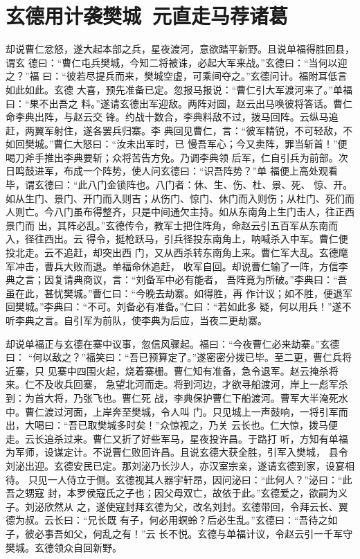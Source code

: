 \chapter{玄德用计袭樊城~元直走马荐诸葛}

却说曹仁忿怒，遂大起本部之兵，星夜渡河，意欲踏平新野。且说单福得胜回县，谓玄
德曰：“曹仁屯兵樊城，今知二将被诛，必起大军来战。”玄德曰：“当何以迎之？”福
曰：“彼若尽提兵而来，樊城空虚，可乘间夺之。”玄德问计。福附耳低言如此如此。玄德
大喜，预先准备已定。忽报马报说：“曹仁引大军渡河来了。”单福曰：“果不出吾之
料。”遂请玄德出军迎敌。两阵对圆，赵云出马唤彼将答话。曹仁命李典出阵，与赵云交
锋。约战十数合，李典料敌不过，拨马回阵。云纵马追赶，两翼军射住，遂各罢兵归寨。李
典回见曹仁，言：“彼军精锐，不可轻敌，不如回樊城。”曹仁大怒曰：“汝未出军时，已
慢吾军心；今又卖阵，罪当斩首！”便喝刀斧手推出李典要斩；众将苦告方免。乃调李典领
后军，仁自引兵为前部。次日鸣鼓进军，布成一个阵势，使人问玄德曰：“识吾阵势？”单
福便上高处观看毕，谓玄德曰：“此八门金锁阵也。八门者：休、生、伤、杜、景、死、
惊、开。如从生门、景门、开门而入则吉；从伤门、惊门、休门而入则伤；从杜门、死们而
人则亡。今八门虽布得整齐，只是中间通欠主持。如从东南角上生门击人，往正西景门而
出，其阵必乱。”玄德传令，教军士把住阵角，命赵云引五百军从东南而入，径往西出。云
得令，挺枪跃马，引兵径投东南角上，呐喊杀入中军。曹仁便投北走。云不追赶，却突出西
门，又从西杀转东南角上来。曹仁军大乱。玄德麾军冲击，曹兵大败而退。单福命休追赶，
收军自回。却说曹仁输了一阵，方信李典之言；因复请典商议，言：“刘备军中必有能者，
吾阵竟为所破。”李典曰：“吾虽在此，甚忧樊城。”曹仁曰：“今晚去劫寨。如得胜，再
作计议；如不胜，便退军回樊城。”李典曰：“不可。刘备必有准备。”仁曰：“若如此多
疑，何以用兵！”遂不听李典之言。自引军为前队，使李典为后应，当夜二更劫寨。

却说单福正与玄德在寨中议事，忽信风骤起。福曰：“今夜曹仁必来劫寨。”玄德曰：
“何以敌之？”福笑曰：“吾已预算定了。”遂密密分拨已毕。至二更，曹仁兵将近寨，只
见寨中四围火起，烧着寨栅。曹仁知有准备，急令退军。赵云掩杀将来。仁不及收兵回寨，
急望北河而走。将到河边，才欲寻船渡河，岸上一彪军杀到：为首大将，乃张飞也。曹仁死
战，李典保护曹仁下船渡河。曹军大半淹死水中。曹仁渡过河面，上岸奔至樊城，令人叫
门。只见城上一声鼓响，一将引军而出，大喝曰：“吾已取樊城多时矣！”众惊视之，乃关
云长也。仁大惊，拨马便走。云长追杀过来。曹仁又折了好些军马，星夜投许昌。于路打
听，方知有单福为军师，设谋定计。不说曹仁败回许昌。且说玄德大获全胜，引军入樊城，
县令刘泌出迎。玄德安民已定。那刘泌乃长沙人，亦汉室宗亲，遂请玄德到家，设宴相待。
只见一人侍立于侧。玄德视其人器宇轩昂，因问泌曰：“此何人？”泌曰：“此吾之甥寇
封，本罗侯寇氏之子也；因父母双亡，故依于此。”玄德爱之，欲嗣为义子。刘泌欣然从
之，遂使寇封拜玄德为父，改名刘封。玄德带回，令拜云长、翼德为叔。云长曰：“兄长既
有子，何必用螟蛉？后必生乱。”玄德曰：“吾待之如子，彼必事吾如父，何乱之有！”云
长不悦。玄德与单福计议，令赵云引一千军守樊城。玄德领众自回新野。

